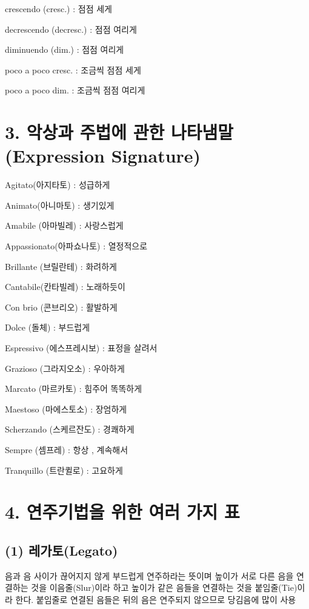 \documentclass[12pt, a4paper, oneside]{book}
\let\stdsection\section
\renewcommand\section{\newpage\stdsection}
\begin{document}
crescendo (cresc.) : 점점 세게

decrescendo (decresc.) : 점점 여리게

diminuendo (dim.) : 점점 여리게

poco a poco cresc. : 조금씩 점점 세게

poco a poco dim. : 조금씩 점점 여리게

%
	\section{3. 악상과 주법에 관한 나타냄말 (Expression Signature) }


Agitato(아지타토) : 성급하게

Animato(아니마토) : 생기있게

Amabile (아마빌레) : 사랑스럽게

Appassionato(아파쇼나토) : 열정적으로

Brillante (브릴란테) : 화려하게

Cantabile(칸타빌레) : 노래하듯이

Con brio (콘브리오) : 활발하게

Dolce (돌체) : 부드럽게

Espressivo (에스프레시보) : 표정을 살려서

Grazioso (그라지오소) : 우아하게

Marcato (마르카토) : 힘주어 똑똑하게

Maestoso (마에스토소) : 장엄하게

Scherzando (스케르잔도) : 경쾌하게

Sempre (셈프레) : 항상 , 계속해서

Tranquillo (트란퀼로) : 고요하게

%
	\section{4. 연주기법을 위한 여러 가지 표}

	\subsection{(1) 레가토(Legato)}

음과 음 사이가 끊어지지 않게 부드럽게 연주하라는 뜻이며
높이가 서로 다른 음을 연결하는 것을 이음줄(Slur)이라 하고
높이가 같은 음들을 연결하는 것을 붙임줄(Tie)이라 한다. 붙임줄로
연결된 음들은 뒤의 음은 연주되지 않으므로 당김음에 많이 사용
\end{document}
